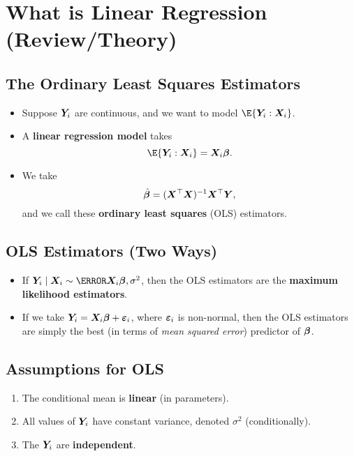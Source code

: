 \section{What is Linear Regression (Review/Theory)}
\subsection*{The Ordinary Least Squares Estimators}
\begin{itemize}
    \item Suppose $ \bm{Y}_i $ are continuous, and we want to model $ \E{\Matrix{Y}_i\given \Matrix{X}_i} $.
    \item A \textbf{linear regression model} takes
          \[ \E{\Matrix{Y}_i\given \Matrix{X}_i}=\Matrix{X}_i\Vector{\beta}. \]
    \item We take
          \[ \hat{\bm{\beta}}=(\bm{X}^\top \bm{X})^{-1}\bm{X}^\top\bm{Y}, \]
          and we call these \textbf{ordinary least squares} (OLS) estimators.
\end{itemize}
\subsection*{OLS Estimators (Two Ways)}
\begin{itemize}
    \item If $ \Matrix{Y}_i\mid \Matrix{X}_i \sim \N{\Matrix{X}_i \Matrix{\beta},\sigma^2} $,
          then the OLS estimators are the \textbf{maximum likelihood estimators}.
    \item If we take $ \bm{Y}_i=\bm{X}_i \bm{\beta}+\bm{\varepsilon}_i $,
          where $ \bm{\varepsilon}_i $ is non-normal, then the OLS estimators
          are simply the best (in terms of \emph{mean squared error})
          predictor of $ \bm{\beta} $.
\end{itemize}
\subsection*{Assumptions for OLS}
\begin{enumerate}[1.]
    \item The conditional mean is \textbf{linear} (in parameters).
    \item All values of $ \bm{Y}_i $ have constant variance,
          denoted $ \sigma^2 $ (conditionally).
    \item The $ \bm{Y}_i $ are \textbf{independent}.
\end{enumerate}
